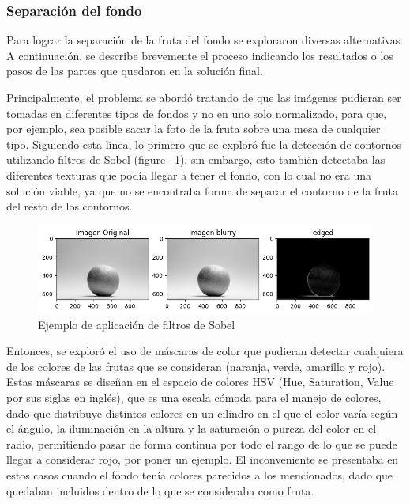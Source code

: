 \documentclass[a4paper, 12pt]{article}
\begin{document}
\subsubsection{Separación del fondo}

Para lograr la separación de la fruta del fondo se exploraron diversas alternativas. A continuación, se describe brevemente el proceso indicando los resultados o los pasos de las partes que quedaron en la solución final.

Principalmente, el problema se abordó tratando de que las imágenes pudieran ser tomadas en diferentes tipos de fondos y no en uno solo normalizado, para que, por ejemplo, sea posible sacar la foto de la fruta sobre una mesa de cualquier tipo. Siguiendo esta línea, lo primero que se exploró fue la detección de contornos utilizando filtros de Sobel (figure ~\ref{SOBEL}), sin embargo, esto también detectaba las diferentes texturas que podía llegar a tener el fondo, con lo cual no era una solución viable, ya que no se encontraba forma de separar el contorno de la fruta del resto de los contornos.
\begin{figure}[!htbp]
    \centering
    \includegraphics[width=0.6\linewidth]{SOBEL.png}
    \caption{Ejemplo de aplicación de filtros de Sobel}
    \label{SOBEL}
\end{figure}
Entonces, se exploró el uso de máscaras de color que pudieran detectar cualquiera de los colores de las frutas que se consideran (naranja, verde, amarillo y rojo). Estas máscaras se diseñan en el espacio de colores HSV (Hue, Saturation, Value por sus siglas en inglés), que es una escala cómoda para el manejo de colores, dado que distribuye distintos colores en un cilindro en el que el color varía según el ángulo, la iluminación en la altura y la saturación o pureza del color en el radio, permitiendo pasar de forma continua por todo el rango de lo que se puede llegar a considerar rojo, por poner un ejemplo. El inconveniente se presentaba en estos casos cuando el fondo tenía colores parecidos a los mencionados, dado que quedaban incluidos dentro de lo que se consideraba como fruta.
\end{document}
